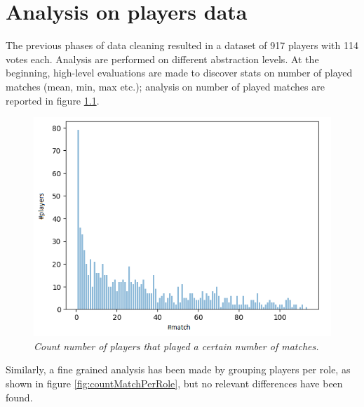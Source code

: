 \chapter {Analysis on players data}

The previous phases of data cleaning resulted in a dataset of 917 players with 114 votes each.
Analysis are performed on different abstraction levels.
At the beginning, high-level evaluations are made to discover stats on number of played matches (mean, min, max etc.); analysis on number of played matches are reported in figure \ref{fig:countMatch}.
\\
\begin{figure}[H]
  \includegraphics[scale=0.9]{images/img-01.png}
   \caption{\textit{Count number of players that played a certain number of matches.}}
  \label{fig:countMatch}
\end{figure}

Similarly, a fine grained analysis has been made by grouping players per role, as shown in figure \ref{fig:countMatchPerRole}, but no relevant differences have been found.

